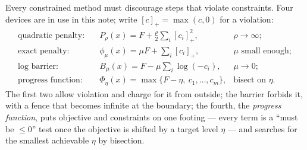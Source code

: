 \documentclass[11pt,a4paper]{article}
\newcommand{\revb}[1]{#1}
\newcommand{\revc}[1]{#1}
\begin{document}
Every constrained method must discourage steps that violate constraints.  \revb{Four}
devices are in use in this note; write $[c]_+=\max(c,0)$ for a violation:
\revc{\begin{align*}
\text{quadratic penalty:}\quad & P_\rho(x)=F+\tfrac\rho2\sum_i[c_i]_+^2, & \rho\to\infty;\\
\text{exact penalty:}\quad & \phi_\mu(x)=\mu F+\sum_i[c_i]_+, & \mu\text{ small enough};\\
\text{log barrier:}\quad & B_\mu(x)=F-\mu\sum_i\log(-c_i), & \mu\to0;\\
\text{progress function:}\quad & \Phi_\eta(x)=\max\{F-\eta,\ c_1,\dots,c_m\}, & \text{bisect on }\eta .
\end{align*}}
The first two allow violation and charge for it from outside; the barrier forbids it,
with a fence that becomes infinite at the boundary; \revb{the fourth, the \emph{progress
function}, puts objective and constraints on one footing --- every term is a ``must be
$\le0$'' test once the objective is shifted by a target level $\eta$ --- and searches
for the smallest achievable $\eta$ by bisection.}
\end{document}
